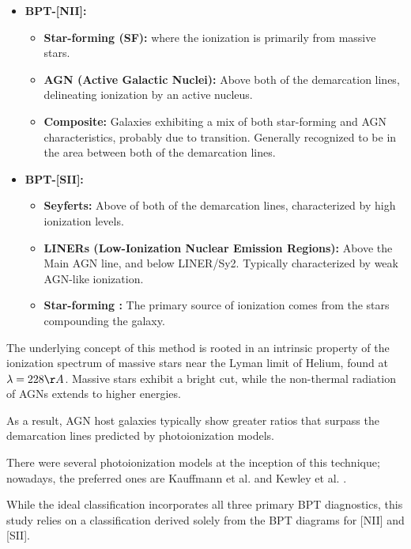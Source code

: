 \begin{itemize}
    \item \textbf{BPT-[NII]:}

		\begin{itemize}
    		\item \textbf{Star-forming (SF):} where the ionization is primarily from massive stars.
    		\item \textbf{AGN (Active Galactic Nuclei):} Above both of the demarcation lines, delineating ionization by an active nucleus.
    		\item \textbf{Composite:} Galaxies exhibiting a mix of both star-forming and AGN characteristics, probably due to transition. Generally recognized to be in the area between both of the demarcation lines.
		\end{itemize}

		\item \textbf{BPT-[SII]:}
	\begin{itemize}
    		\item \textbf{Seyferts:} Above of both of the demarcation lines, characterized by high ionization levels.
    		\item \textbf{LINERs (Low-Ionization Nuclear Emission Regions):} Above the Main AGN line, and below LINER/Sy2.  Typically characterized by weak AGN-like ionization.
    		\item \textbf{Star-forming :} The primary source of ionization comes from the stars compounding the galaxy.
		\end{itemize}

\end{itemize}



The underlying concept of this method is rooted in an intrinsic property of the ionization spectrum of massive stars near the Lyman limit of Helium, found at $\lambda = 228\AA$. Massive stars exhibit a bright cut, while the non-thermal radiation of AGNs extends to higher energies. 

As a result, AGN host galaxies typically show greater ratios that surpass the demarcation lines predicted by photoionization models.

There were several photoionization models at the inception of this technique; nowadays, the preferred ones are Kauffmann et al. \cite{2003MNRAS.346.1055K} and Kewley et al. \cite{2001ApJ...556..121K}.

While the ideal classification incorporates all three primary BPT diagnostics, this study relies on a classification derived solely from the BPT diagrams for [NII] and [SII].

